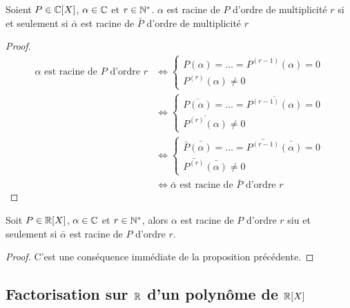 \begin{prop}
  Soient $P \in \mathbb{C}[X]$, $ \alpha \in \mathbb{C}$ et $r \in \mathbb{N}^*$. $\alpha$ est racine de $P$ d'ordre de multiplicité $r$ si et seulement si $\bar{\alpha}$ est racine de $\bar{P}$ d'ordre de multiplicité $r$
\end{prop}
\begin{proof}
  \begin{align}
    \alpha \text{~est racine de~} P \text{~d'ordre~} r &\iff
    \begin{cases}
      P(\alpha) = \ldots = P^{(r-1)}(\alpha)=0\\
      P^{(r)}(\alpha)\neq 0
    \end{cases}\\
    &\iff 
     \begin{cases}
      \overline{P(\alpha)} = \ldots = \overline{P^{(r-1)}(\alpha)}=0\\
      \overline{P^{(r)}(\alpha)}\neq 0
    \end{cases}\\
    &\iff 
     \begin{cases}
      \bar{P}\bar{(\alpha)} = \ldots = \bar{P^{(r-1)}}\bar{(\alpha)}=0\\
      \bar{P^{(r)}}\bar{(\alpha)}\neq 0
    \end{cases}\\
    &\iff \bar{\alpha} \text{~est racine de~} \bar{P} \text{~d'ordre~} r
  \end{align}
\end{proof}

\begin{prop}
  Soit $P \in \mathbb{R}[X]$, $\alpha \in \mathbb{C}$ et $r \in \mathbb{N}^*$, alors $\alpha$ est racine de $P$ d'ordre $r$ siu et seulement si $\bar{\alpha}$ est racine de $P$ d'ordre $r$.
\end{prop}
\begin{proof}
  C'est une conséquence immédiate de la proposition précédente.
\end{proof}

\subsection{Factorisation sur $\mathbb{R}$ d'un polynôme de $\mathbb{R}[X]$}

